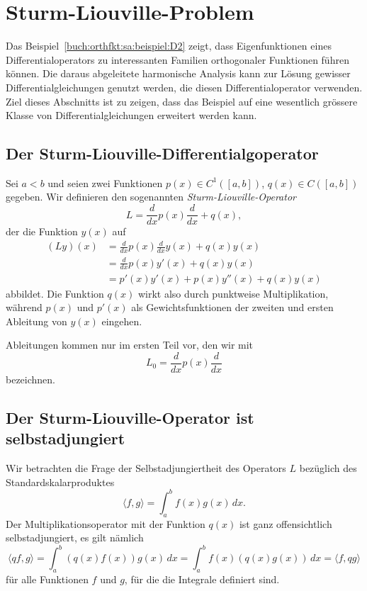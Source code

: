 %
%
%
\section{Sturm-Liouville-Problem
\label{buch:orthofkt:section:sturmliouville}}
Das Beispiel~\ref{buch:orthfkt:sa:beispiel:D2} zeigt, dass
Eigenfunktionen eines Differentialoperators zu interessanten
Familien orthogonaler Funktionen führen können.
Die daraus abgeleitete harmonische Analysis kann zur Lösung
gewisser Differentialgleichungen genutzt werden, die diesen
Differentialoperator verwenden.
Ziel dieses Abschnitts ist zu zeigen, dass das Beispiel auf
eine wesentlich grössere Klasse von Differentialgleichungen
erweitert werden kann.

%
%
\subsection{Der Sturm-Liouville-Differentialgoperator
\label{buch:orthofkt:sturmliouville:subsection:operator}}
Sei $a<b$ und seien zwei Funktionen
$p(x)\in C^1([a,b])$, $q(x)\in C([a,b])$ gegeben.
Wir definieren den sogenannten {\em Sturm-Liouville-Operator}
%
\[
L = \frac{d}{dx} p(x) \frac{d}{dx} + q(x),
\]
der die Funktion $y(x)$ auf
\begin{align*}
(Ly)(x)
&=
\frac{d}{dx}p(x)\frac{d}{dx}y(x) + q(x)y(x)
\\
&=
\frac{d}{dx}p(x)y'(x) + q(x)y(x)
\\
&=
p'(x)y'(x)+p(x)y''(x)+q(x)y(x)
\end{align*}
abbildet.
Die Funktion $q(x)$ wirkt also durch punktweise Multiplikation,
während $p(x)$ und $p'(x)$ als Gewichtsfunktionen der zweiten und
ersten Ableitung von $y(x)$ eingehen.

Ableitungen kommen nur im ersten Teil vor, den wir mit
\[
L_0
=
\frac{d}{dx}p(x)\frac{d}{dx}
\]
bezeichnen.

%
%
\subsection{Der Sturm-Liouville-Operator ist selbstadjungiert}
Wir betrachten die Frage der Selbstadjungiertheit des
Operators $L$ bezüglich des Standardskalarproduktes
\[
\langle f,g\rangle
=
\int_a^b f(x)g(x)\,dx.
\]
Der Multiplikationsoperator mit der Funktion $q(x)$ ist ganz
offensichtlich selbstadjungiert, es gilt nämlich
\[
\langle qf,g\rangle
=
\int_a^b (q(x)f(x))g(x)\,dx
=
\int_a^b f(x)(q(x)g(x))\,dx
=
\langle f,qg\rangle
\]
für alle Funktionen $f$ und $g$, für die die Integrale definiert sind.


